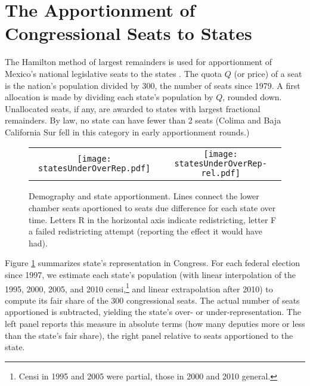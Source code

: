 \documentclass[letter,12pt]{article}
\begin{document}
\section{The Apportionment of Congressional Seats to States}

The Hamilton method of largest remainders is used for apportionment of Mexico's national legislative seats to the states \citep[][:10]{balinskiYoung2001FairRep}. The quota $Q$ (or price) of a seat is the nation's population divided by 300, the number of seats since 1979. A first allocation is made by dividing each state's population by $Q$, rounded down. Unallocated seats, if any, are awarded to states with largest fractional remainders. By law, no state can have fewer than 2 seats (Colima and Baja California Sur fell in this category in early apportionment rounds.) 

\begin{figure}
\begin{center}
  \begin{tabular}{cc}
    \texttt{[image: statesUnderOverRep.pdf]} & 
    \texttt{[image: statesUnderOverRep-rel.pdf]} \\ 
  \end{tabular}
  \caption{Demography and state apportionment. Lines connect the lower chamber seats aportioned to seats due difference for each state over time. Letters R in the horizontal axis indicate redistricting, letter F a failed redistricting attempt (reporting the effect it would have had).}\label{F:underOverRep}
\end{center}
\end{figure}

Figure \ref{F:underOverRep} summarizes state's representation in Congress. For each federal election since 1997, we estimate each state's population (with linear interpolation of the 1995, 2000, 2005, and 2010 censi,\footnote{Censi in 1995 and 2005 were partial, those in 2000 and 2010 general.} and linear extrapolation after 2010) to compute its fair share of the 300 congressional seats. The actual number of seats apportioned is subtracted, yielding the state's over- or under-representation. The left panel reports this measure in absolute terms (how many deputies more or less than the state's fair share), the right panel relative to seats apportioned to the state.  
\end{document}
